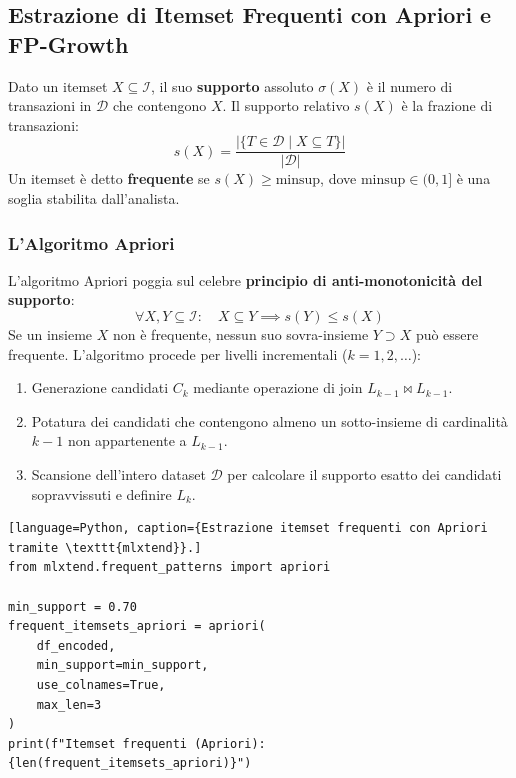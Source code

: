 \FloatBarrier
\subsection{Estrazione di Itemset Frequenti con Apriori e FP-Growth}
\label{subsec:lab-apriori-fpgrowth}

\begin{definition}
Dato un itemset $X \subseteq \mathcal{I}$, il suo \textbf{supporto} assoluto $\sigma(X)$ è il numero di transazioni in $\mathcal{D}$ che contengono $X$. Il supporto relativo $s(X)$ è la frazione di transazioni:
\begin{equation}
    s(X) = \frac{|\{T \in \mathcal{D} \mid X \subseteq T\}|}{|\mathcal{D}|}
\end{equation}
Un itemset è detto \textbf{frequente} se $s(X) \ge \text{minsup}$, dove $\text{minsup} \in (0, 1]$ è una soglia stabilita dall'analista.
\end{definition}

\subsubsection{L'Algoritmo Apriori}
L'algoritmo Apriori \cite{agrawal1994} poggia sul celebre \textbf{principio di anti-monotonicità del supporto}:
\begin{equation}
    \forall X, Y \subseteq \mathcal{I}: \quad X \subseteq Y \implies s(Y) \le s(X)
\end{equation}
Se un insieme $X$ non è frequente, nessun suo sovra-insieme $Y \supset X$ può essere frequente. L'algoritmo procede per livelli incrementali ($k = 1, 2, \dots$):
\begin{enumerate}
    \item Generazione candidati $C_k$ mediante operazione di join $L_{k-1} \bowtie L_{k-1}$.
    \item Potatura dei candidati che contengono almeno un sotto-insieme di cardinalità $k-1$ non appartenente a $L_{k-1}$.
    \item Scansione dell'intero dataset $\mathcal{D}$ per calcolare il supporto esatto dei candidati sopravvissuti e definire $L_k$.
\end{enumerate}

\begin{lstlisting}[language=Python, caption={Estrazione itemset frequenti con Apriori tramite \texttt{mlxtend}}.]
from mlxtend.frequent_patterns import apriori

min_support = 0.70
frequent_itemsets_apriori = apriori(
    df_encoded, 
    min_support=min_support, 
    use_colnames=True, 
    max_len=3
)
print(f"Itemset frequenti (Apriori): {len(frequent_itemsets_apriori)}")
\end{lstlisting}

